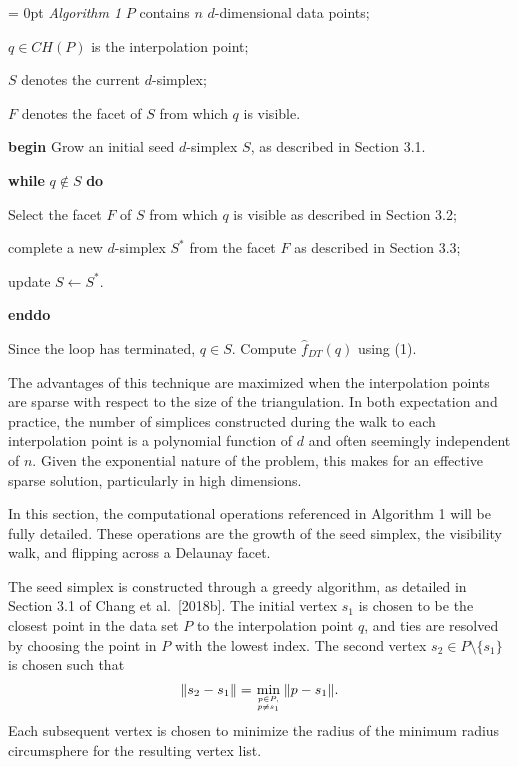 {{\parindent =0pt \parskip= 0pt
\smallskip
\leftskip 20pt
{\sl Algorithm 1}
\smallskip
$P$ contains $n$ $d$-dimensional data points;\par
$q \in CH(P)$ is the interpolation point;\par
$S$ denotes the current $d$-simplex; \par
$F$ denotes the facet of $S$ from which $q$ is visible. \par
\smallskip
{\bf begin}
Grow an initial seed $d$-simplex $S$, as described in Section 3.1.\par
{\bf while} $q \not\in S$ {\bf do}\par
\leftskip 40pt
Select the facet $F$ of $S$ from which $q$ is visible as
described in Section 3.2;\par
complete a new $d$-simplex $S^*$ from the facet $F$ as described 
in Section 3.3;\par
update $S \leftarrow S^*$.\par
\leftskip 20pt
{\bf enddo}\par
Since the loop has terminated, $q\in S$.
Compute ${\hat f}_{DT}(q)$ using (1).\par
\smallskip}

The advantages of this technique are maximized when the interpolation
points are sparse with respect to the size of the triangulation. In
both expectation and practice, the number of simplices constructed
during the walk to each interpolation point is a polynomial function
of $d$ and often seemingly independent of $n$. Given the exponential
nature of the problem, this makes for an effective sparse solution,
particularly in high dimensions.


In this section, the computational operations referenced in Algorithm 1
will be fully detailed.
These operations are the growth of the seed simplex, the visibility walk,
and flipping across a Delaunay facet.


The seed simplex is constructed through a greedy algorithm, as detailed
in Section 3.1 of Chang et al.\ [2018b]. The initial vertex $s_1$ is
chosen to be the closest point in the data set $P$ to the interpolation
point $q$, and ties are resolved by choosing the point in $P$ with the
lowest index.
The second vertex $s_2 \in P \setminus \{s_1\}$ is chosen such that
$$
\|s_2 - s_1\| = \min_{p \in P, \atop p\ne s_1} \|p - s_1\|.
$$
Each subsequent vertex is chosen to minimize the radius of the minimum
radius circumsphere for the resulting vertex list.

}
